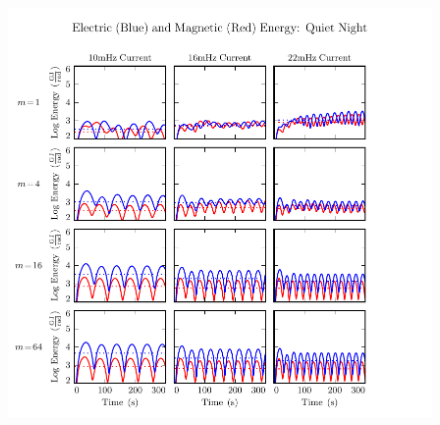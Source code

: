 \begin{figure}[H]
    \centering
    \includegraphics[width=\textwidth]{figures/UB_UE_J_4.pdf}
    \caption[Current-Driven Electric and Magnetic Energy: Quiet Night]{}
    \label{fig_UB_UE_J_4}
\end{figure}










